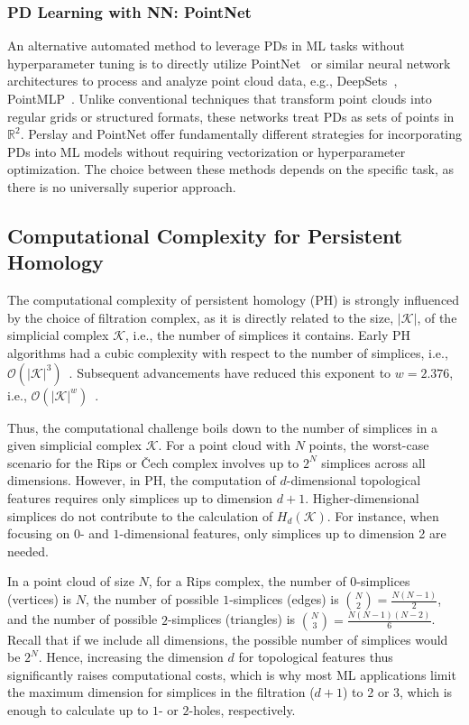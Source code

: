 \subsubsection{PD Learning with NN: PointNet} \label{sec:pointnet} An alternative automated method to leverage PDs in ML tasks without hyperparameter tuning is to directly utilize PointNet~\cite{qi2017pointnet} or similar neural network architectures to process and analyze point cloud data, e.g., DeepSets~\cite{zaheer2017deep}, PointMLP~\cite{ma2022rethinking}. Unlike conventional techniques that transform point clouds into regular grids or structured formats, these networks treat PDs as sets of points in $\mathbb{R}^2$. Perslay and PointNet offer fundamentally different strategies for incorporating PDs into ML models without requiring vectorization or hyperparameter optimization. The choice between these methods depends on the specific task, as there is no universally superior approach.
 


\subsection{Computational Complexity for Persistent Homology} \label{sec:compComplexity}

 

The computational complexity of persistent homology (PH) is strongly influenced by the choice of filtration complex, as it is directly related to the size, $|\mathcal{K}|$, of the simplicial complex $\mathcal{K}$, i.e., the number of simplices it contains. Early PH algorithms had a cubic complexity with respect to the number of simplices, i.e., $\mathcal{O}(|\mathcal{K}|^3)$~\cite{morozov2005persistence}. Subsequent advancements have reduced this exponent to $w = 2.376$, i.e., $\mathcal{O}(|\mathcal{K}|^w)$~\cite{otter2017roadmap}. 

Thus, the computational challenge boils down to the number of simplices in a given simplicial complex $\mathcal{K}$. For a point cloud with $N$ points, the worst-case scenario for the Rips or \v{C}ech complex involves up to $2^N$ simplices across all dimensions. However, in PH, the computation of $d$-dimensional topological features requires only simplices up to dimension $d+1$. Higher-dimensional simplices do not contribute to the calculation of $H_d(\mathcal{K})$. For instance, when focusing on $0$- and $1$-dimensional features, only simplices up to dimension 2 are needed. 

In a point cloud of size $N$, for a Rips complex, the number of $0$-simplices (vertices) is $N$, the number of possible $1$-simplices (edges) is $\binom{N}{2} = \frac{N(N-1)}{2}$, and the number of possible $2$-simplices (triangles) is $\binom{N}{3} = \frac{N(N-1)(N-2)}{6}$. Recall that if we include all dimensions, the possible number of simplices would be $2^N$.  Hence, increasing the dimension $d$ for topological features thus significantly raises computational costs, which is why most ML applications limit the maximum dimension for simplices in the filtration ($d+1$)  to 2 or 3, which is enough to calculate up to $1$- or $2$-holes, respectively.

